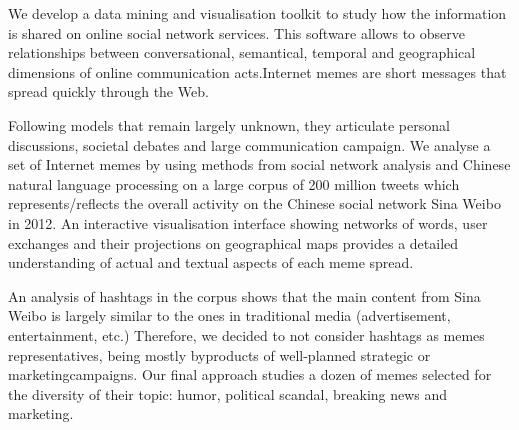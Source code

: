 

We develop a data mining and visualisation toolkit to study how the information is shared on online social network services. This software allows to observe relationships between conversational, semantical, temporal and geographical dimensions of online communication acts.Internet memes are short messages that spread quickly through the Web. 

Following models that remain largely unknown, they articulate personal discussions, societal debates and large communication campaign. We analyse a set of Internet memes by using methods from social network analysis and Chinese natural language processing on a large corpus of 200 million tweets which represents/reflects the overall activity on the Chinese social network Sina Weibo in 2012. An interactive visualisation interface showing networks of words, user exchanges and their projections on geographical maps provides a detailed understanding of actual and textual aspects of each meme spread.

An analysis of hashtags in the corpus shows that the main content from Sina Weibo is largely similar to the ones in traditional media (advertisement, entertainment, etc.) Therefore, we decided to not consider hashtags as memes representatives, being mostly byproducts of well-planned strategic or marketingcampaigns. Our final approach studies a dozen of memes selected for the diversity of their topic: humor, political scandal, breaking news and marketing.


